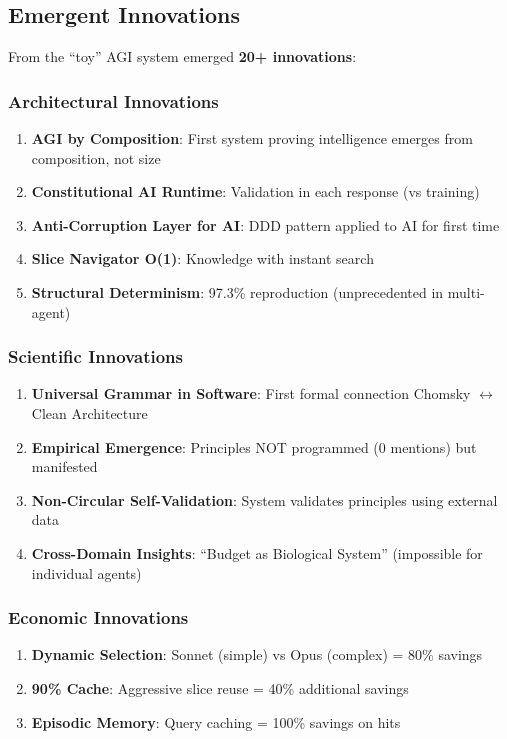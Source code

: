 \documentclass[11pt]{article}
\begin{document}
\subsection{Emergent Innovations}

From the ``toy'' AGI system emerged \textbf{20+ innovations}:

\subsubsection{Architectural Innovations}

\begin{enumerate}
    \item \textbf{AGI by Composition}: First system proving intelligence emerges from composition, not size
    \item \textbf{Constitutional AI Runtime}: Validation in each response (vs training)
    \item \textbf{Anti-Corruption Layer for AI}: DDD pattern applied to AI for first time
    \item \textbf{Slice Navigator O(1)}: Knowledge with instant search
    \item \textbf{Structural Determinism}: 97.3\% reproduction (unprecedented in multi-agent)
\end{enumerate}

\subsubsection{Scientific Innovations}

\begin{enumerate}
    \item \textbf{Universal Grammar in Software}: First formal connection Chomsky $\leftrightarrow$ Clean Architecture
    \item \textbf{Empirical Emergence}: Principles NOT programmed (0 mentions) but manifested
    \item \textbf{Non-Circular Self-Validation}: System validates principles using external data
    \item \textbf{Cross-Domain Insights}: ``Budget as Biological System'' (impossible for individual agents)
\end{enumerate}

\subsubsection{Economic Innovations}

\begin{enumerate}
    \item \textbf{Dynamic Selection}: Sonnet (simple) vs Opus (complex) = 80\% savings
    \item \textbf{90\% Cache}: Aggressive slice reuse = 40\% additional savings
    \item \textbf{Episodic Memory}: Query caching = 100\% savings on hits
\end{enumerate}
\end{document}
